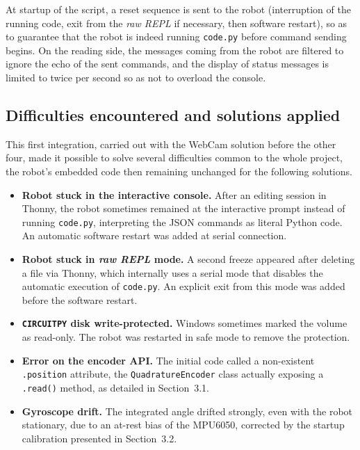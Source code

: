 \documentclass[12pt,a4paper]{report}
\begin{document}
	At startup of the script, a reset sequence is sent to the robot (interruption of the running code, exit from the \textit{raw REPL} if necessary, then software restart), so as to guarantee that the robot is indeed running \texttt{code.py} before command sending begins. On the reading side, the messages coming from the robot are filtered to ignore the echo of the sent commands, and the display of status messages is limited to twice per second so as not to overload the console.
	
	\subsection*{Difficulties encountered and solutions applied}
	
	This first integration, carried out with the WebCam solution before the other four, made it possible to solve several difficulties common to the whole project, the robot's embedded code then remaining unchanged for the following solutions.
	
	\begin{itemize}
		\item \textbf{Robot stuck in the interactive console.} After an editing session in Thonny, the robot sometimes remained at the interactive prompt instead of running \texttt{code.py}, interpreting the JSON commands as literal Python code. An automatic software restart was added at serial connection.
		\item \textbf{Robot stuck in \textit{raw REPL} mode.} A second freeze appeared after deleting a file via Thonny, which internally uses a serial mode that disables the automatic execution of \texttt{code.py}. An explicit exit from this mode was added before the software restart.
		\item \textbf{\texttt{CIRCUITPY} disk write-protected.} Windows sometimes marked the volume as read-only. The robot was restarted in safe mode to remove the protection.
		\item \textbf{Error on the encoder API.} The initial code called a non-existent \texttt{.position} attribute, the \texttt{QuadratureEncoder} class actually exposing a \texttt{.read()} method, as detailed in Section~3.1.
		\item \textbf{Gyroscope drift.} The integrated angle drifted strongly, even with the robot stationary, due to an at-rest bias of the MPU6050, corrected by the startup calibration presented in Section~3.2.
	\end{itemize}
	
\end{document}
